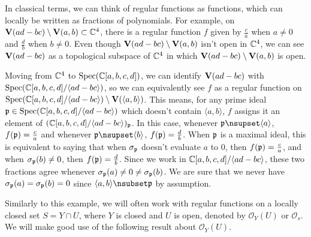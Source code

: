 \begin{example}\label{ex:reg_fun}\upshape
  In classical terms, we can think of regular functions as functions, which can locally be written as fractions of polynomials. For example, on $\operatorname{\mathbf V}(ad - bc) \setminus \operatorname{\mathbf V}(a, b) \subset \mathbb{C}^{4}$, there is a regular function $f$ given by $\frac c a$ when $a \neq 0$ and $\frac d b$ when $b \neq 0$. Even though $\operatorname{\mathbf V}(ad - bc) \setminus \operatorname{\mathbf V}(a, b)$ isn't open in $\mathbb{C}^{4}$, we can see $\operatorname{\mathbf V}(ad - bc)$ as a topological subspace of $\mathbb{C}^{4}$ in which $\operatorname{\mathbf V}(ad - bc) \setminus \operatorname{\mathbf V}(a, b)$ is open.

  Moving from $\mathbb{C}^{4}$ to $\operatorname{Spec}(\mathbb{C}[a, b, c, d])$, we can identify $\operatorname{\mathbf V}(ad - bc)$ with $\operatorname{Spec}(\mathbb{C}[a, b, c, d]/\langle ad - bc \rangle)$, so we can equivalently see $f$ as a regular function on $\operatorname{Spec}(\mathbb{C}[a, b, c, d]/\langle ad - bc \rangle) \setminus \operatorname{\mathbf V}(\langle a, b \rangle)$. This means, for any prime ideal $\mathfrak p \in \operatorname{Spec}(\mathbb{C}[a, b, c, d]/\langle ad - bc \rangle)$ which doesn't contain $\langle a, b \rangle$, $f$ assigns it an element of $(\mathbb{C}[a, b, c, d]/\langle ad - bc \rangle)_{\mathfrak p}$. In this case, whenever $\p \nsupset \langle a \rangle$, $f(\mathfrak p) = \frac c a$ and whenever $\p \nsupset \langle b \rangle$, $f(\mathfrak p) = \frac d b$. When $\mathfrak p$ is a maximal ideal, this is equivalent to saying that when $\sigma_{\mathfrak p}$ doesn't evaluate $a$ to 0, then $f(\mathfrak p) = \frac c a$, and when $\sigma_{\mathfrak p}(b) \neq 0$, then $f(\mathfrak p) = \frac d b$. Since we work in $\mathbb{C}[a, b, c, d]/\langle ad - bc \rangle$, these two fractions agree whenever $\sigma_{\mathfrak p}(a) \neq 0 \neq \sigma_{\mathfrak p}(b)$. We are sure that we never have $\sigma_{\mathfrak p}(a) = \sigma_{\mathfrak p}(b) = 0$ since $\langle a, b \rangle \nsubset \p$ by assumption.
\end{example}

Similarly to this example, we will often work with regular functions on a locally closed set $S = Y \cap U$, where $Y$ is closed and $U$ is open, denoted by $\mathcal O_{Y}(U)$ or $\mathcal O_{s}$. We will make good use of the following result about $\mathcal O_{Y}(U)$.

